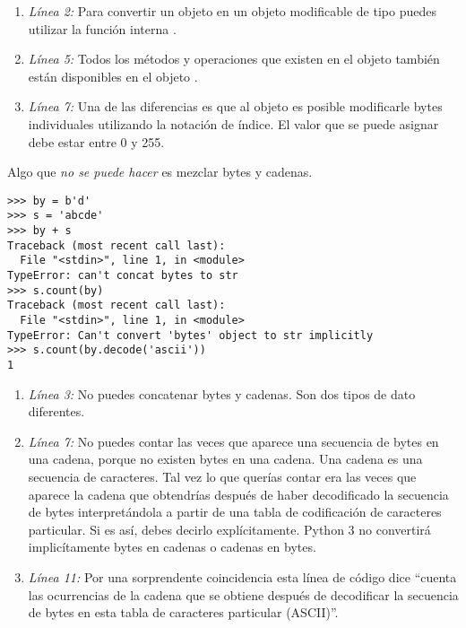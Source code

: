 \begin{enumerate}

\item \emph{Línea 2:} Para convertir un objeto  en un objeto modificable de tipo  puedes utilizar la función interna .

\item \emph{Línea 5:} Todos los métodos y operaciones que existen en el objeto  también están disponibles en el objeto .

\item \emph{Línea 7:} Una de las diferencias es que al objeto  es posible modificarle bytes individuales utilizando la notación de índice. El valor que se puede asignar debe estar entre 0 y 255.

\end{enumerate}

Algo que \emph{no se puede hacer} es mezclar bytes y cadenas.

\noindent\begin{minipage}{\textwidth}
\begin{lstlisting}[mathescape=True]
>>> by = b'd'
>>> s = 'abcde'
>>> by + s
Traceback (most recent call last):
  File "<stdin>", line 1, in <module>
TypeError: can't concat bytes to str
>>> s.count(by)
Traceback (most recent call last):
  File "<stdin>", line 1, in <module>
TypeError: Can't convert 'bytes' object to str implicitly
>>> s.count(by.decode('ascii'))
1
\end{lstlisting}
\end{minipage}

\begin{enumerate}

\item \emph{Línea 3:} No puedes concatenar bytes y cadenas. Son dos tipos de dato diferentes.

\item \emph{Línea 7:} No puedes contar las veces que aparece una secuencia de bytes en una cadena, porque no existen bytes en una cadena. Una cadena es una secuencia de caracteres. Tal vez lo que querías contar era las veces que aparece la cadena que obtendrías después de haber decodificado la secuencia de bytes interpretándola a partir de una tabla de codificación de caracteres particular. Si es así, debes decirlo explícitamente. Python 3 no convertirá implicítamente bytes en cadenas o cadenas en bytes.

\item \emph{Línea 11:} Por una sorprendente coincidencia esta línea de código dice ``cuenta las ocurrencias de la cadena que se obtiene después de decodificar la secuencia de bytes en esta tabla de caracteres particular (ASCII)''. 

\end{enumerate}

